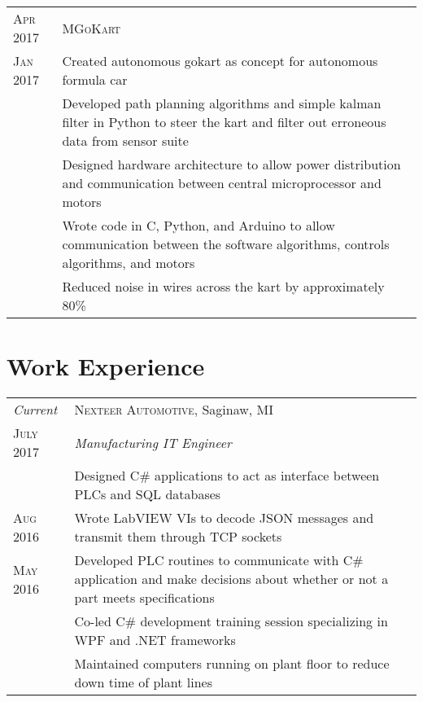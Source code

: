\documentclass[a4paper,12pt]{article} %
\begin{document}
\begin{tabular}{R{2.1cm}|p{15.5cm}}
\hspace{4pt}\textsc{Apr 2017} & \textsc{MGoKart} \\
\textsc{Jan 2017} & \footnotesize{Created autonomous gokart as concept for autonomous formula car} \\
& \footnotesize{Developed path planning algorithms and simple kalman filter in
  Python to steer the kart and filter out erroneous data from sensor suite} \\
& \footnotesize{Designed hardware architecture to allow power distribution and
 communication between central microprocessor and motors} \\
& \footnotesize{Wrote code in C, Python, and Arduino to allow communication
 between the software algorithms, controls algorithms, and motors} \\
& \footnotesize{Reduced noise in wires across the kart by approximately 80\%} \\
\end{tabular}


\section{Work Experience}

\begin{tabular}{R{2.1cm}|p{15.5cm}}
\emph{Current} & \textsc{Nexteer Automotive}, Saginaw, MI \\
\textsc{July 2017} & \emph{Manufacturing IT Engineer} \\
& \footnotesize{Designed C\# applications to act as interface
  between PLCs and SQL databases} \\
\textsc{Aug 2016} & \footnotesize{Wrote LabVIEW VIs to decode JSON messages
  and transmit them through TCP sockets}\\
\textsc{May 2016} & \footnotesize{Developed PLC routines to communicate with C\#
  application and make decisions about whether or not a part meets specifications} \\
& \footnotesize{Co-led C\# development training session specializing in WPF and .NET frameworks}\\
& \footnotesize{Maintained computers running on plant floor to reduce down time
  of plant lines} \\
\end{tabular}
\end{document}
